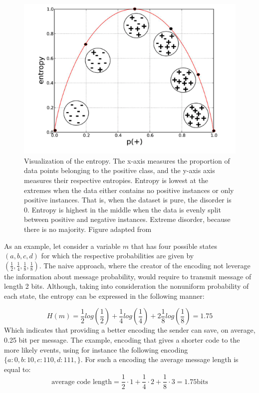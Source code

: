 \begin{figure}[h]
\centering
\includegraphics{figures/Entropy.png}
\caption{Visualization of the entropy. The x-axis measures the proportion of data points belonging to the positive class, and the y-axis axis measures their respective entropies. Entropy is lowest at the extremes when the data either contains no positive instances or only positive instances. That is, when the dataset is pure, the disorder is 0. Entropy is highest in the middle when the data is evenly split between positive and negative instances. Extreme disorder, because there is no majority. Figure adapted from \cite{DS_for_buisness}   
\label{fig:entropy}}
\end{figure}


As an example, let consider a variable $m$ that has four possible states \\ $(a, b, c, d)$ for which the respective probabilities are given by \\ $(\frac{1}{2},\frac{1}{4},\frac{1}{8},\frac{1}{8})$.
The naive approach, where the creator of the encoding not leverage the information about message probability, would require to transmit message of length 2 bits. Although, taking into consideration the nonuniform probability of each state, the entropy can be expressed in the following manner: 

\begin{equation}
    H(m) = \frac{1}{2} log(\frac{1}{2}) + \frac{1}{4}  log(\frac{1}{4}) + 2 \frac{1}{8} log(\frac{1}{8}) =1.75
\end{equation}
Which indicates that providing a better encoding the sender can save, on average, 0.25 bit per message. The example, encoding that gives a shorter code to the more likely events, using for instance the following encoding $\{a:0, b:10, c:110, d:111, \}$. For such a encoding the average message length is equal to: 
\begin{equation}
\label{eq:entropy example}
    \text{average code length}= \frac{1}{2}\cdot 1 + \frac{1}{4}\cdot 2 + \frac{1}{8}\cdot 3 = 1.75 \text{bits}
\end{equation}


